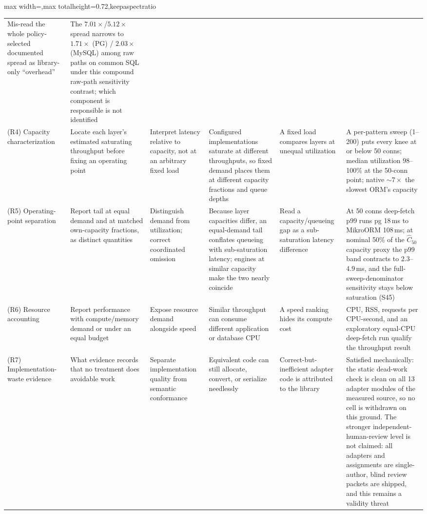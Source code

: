 \begin{table}[htbp]
\begin{adjustbox}{max width=\textwidth,max totalheight=0.72\textheight,keepaspectratio}
\begin{tabular}{p{1.7cm} p{2.3cm} p{2.5cm} p{3.3cm} p{2.5cm} p{3.4cm}}
    Mis-read the whole policy-selected documented spread as library-only ``overhead'' &
    The $7.01\times$/$5.12\times$ spread narrows to $1.71\times$ (PG) / $2.03\times$ (MySQL) among raw paths on common SQL under this compound raw-path sensitivity contrast; which component is responsible is not identified \\
    \addlinespace
    (R4) Capacity characterization &
    Locate each layer's estimated saturating throughput before fixing an operating point &
    Interpret latency relative to capacity, not at an arbitrary fixed load &
    Configured implementations saturate at different throughputs, so fixed demand places them at different capacity fractions and queue depths &
    A fixed load compares layers at unequal utilization &
    A per-pattern sweep (1--200) puts every knee at or below 50 conns; median utilization 98--100\% at the 50-conn point; native $\sim$$7\times$ the slowest ORM's capacity \\
    \addlinespace
    (R5) Operating-point separation &
    Report tail at equal demand and at matched own-capacity fractions, as distinct quantities &
    Distinguish demand from utilization; correct coordinated omission &
    Because layer capacities differ, an equal-demand tail conflates queueing with sub-saturation latency; engines at similar capacity make the two nearly coincide &
    Read a capacity/queueing gap as a sub-saturation latency difference &
    At 50 conns deep-fetch p99 runs pg 18\,ms to MikroORM 108\,ms; at nominal 50\% of the $\widehat C_{50}$ capacity proxy the p99 band contracts to 2.3--4.9\,ms, and the full-sweep-denominator sensitivity stays below saturation (S45) \\
    \addlinespace
    (R6) Resource accounting &
    Report performance with compute/memory demand or under an equal budget &
    Expose resource demand alongside speed &
    Similar throughput can consume different application or database CPU &
    A speed ranking hides its compute cost &
    CPU, RSS, requests per CPU-second, and an exploratory equal-CPU deep-fetch run qualify the throughput result \\
    \addlinespace
    (R7) Implementation-waste evidence &
    What evidence records that no treatment does avoidable work &
    Separate implementation quality from semantic conformance &
    Equivalent code can still allocate, convert, or serialize needlessly &
    Correct-but-inefficient adapter code is attributed to the library &
    Satisfied mechanically: the static dead-work check is clean on all 13 adapter modules of the measured source, so no cell is withdrawn on this ground. The stronger independent-human-review level is not claimed: all adapters and assignments are single-author, blind review packets are shipped, and this remains a validity threat \\
    \bottomrule
  \end{tabular}
  \end{adjustbox}
\end{table}
